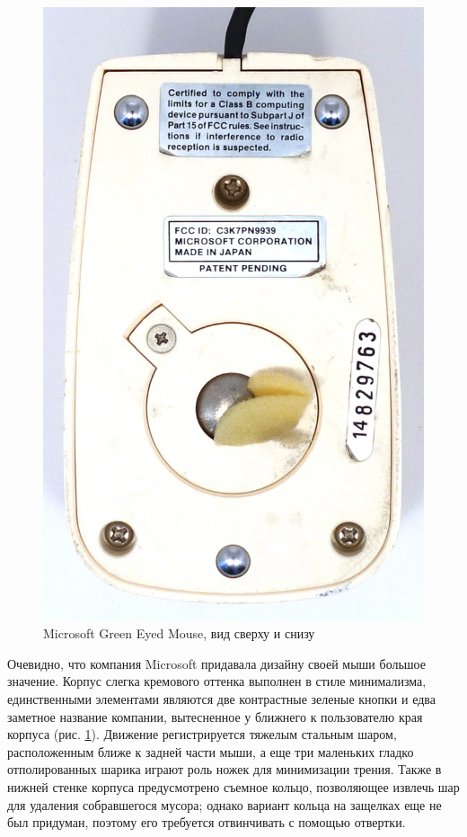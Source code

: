 \documentclass[11pt, a4paper]{article}
\begin{document}
\begin{figure}[h]
    \includegraphics[scale=0.55]{1983_microsoft_green_eyed_mouse/bottom_60.jpg}
    \caption{Microsoft Green Eyed Mouse, вид сверху и снизу}
    \label{fig:MicrosoftGreenEyedTopAndBottom}
\end{figure}

Очевидно, что компания Microsoft придавала дизайну своей мыши большое значение. Корпус слегка кремового оттенка выполнен в стиле минимализма, единственными элементами являются две контрастные зеленые кнопки и едва заметное название компании, вытесненное у ближнего к пользователю края корпуса (рис. \ref{fig:MicrosoftGreenEyedTopAndBottom}). Движение регистрируется тяжелым стальным шаром, расположенным ближе к задней части мыши, а еще три маленьких гладко отполированных шарика играют роль ножек для минимизации трения. Также в нижней стенке корпуса предусмотрено съемное кольцо, позволяющее извлечь шар для удаления собравшегося мусора; однако вариант кольца на защелках еще не был придуман, поэтому его требуется отвинчивать с помощью отвертки.
\end{document}

